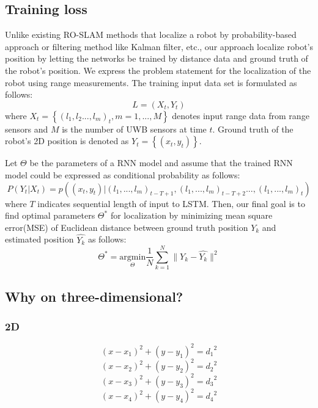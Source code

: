 \documentclass{ieeeaccess}
\begin{document}
\subsection{Training loss}

 Unlike existing RO-SLAM methods that localize a robot by probability-based approach or filtering method like Kalman filter, etc., our approach localize  robot's position by letting the networks be trained by distance data and ground truth of the robot's position. We express the problem statement for the localization of the robot using range measurements. The training input data set is formulated as follows: 
\begin{equation}
L = {(X_t, Y_t)} 
\end{equation}
where $X_t = \left\{(l_1, l_2... , l_m)_t, m = 1,...,M \right \}$ denotes input range data from range sensors and $M$ is the number of UWB sensors at time $t$. Ground truth of the robot's 2D position is denoted as $Y_t = \left\{(x_t, y_t)\right \}$.

Let $\Theta$ be the parameters of a RNN model and assume that the trained RNN model could be expressed as conditional probability as follows:
\begin{equation}
P(Y_t|X_t) = p((x_t, y_t)|(l_1,..., l_m)_{t-T+1},(l_1,..., l_m)_{t-T+2}..., (l_1,..., l_m)_t)
\end{equation}  
where $T$ indicates sequential length of input to LSTM. Then, our final goal is to find optimal parameters $\Theta^{*}$ for localization by minimizing mean square error(MSE) of Euclidean distance between ground truth position $Y_k$ and estimated position $\hat{Y_k}$ as follows:
\begin{equation}
\Theta^{*} = \underset{\Theta}{\mathrm{argmin}} \frac{1}{N} \sum_{k=1}^N \parallel Y_k - \hat{Y_k} \parallel^{2}
\end{equation}  

\subsection{Why on three-dimensional?}
\subsubsection{2D}
\begin{equation}
(x-x_1)^2+(y-y_1)^2={d_1}^2
\end{equation}
\begin{equation}
(x-x_2)^2+(y-y_2)^2={d_2}^2
\end{equation}
\begin{equation}
(x-x_3)^2+(y-y_3)^2={d_3}^2
\end{equation}
\begin{equation}
(x-x_4)^2+(y-y_4)^2={d_4}^2
\end{equation}
\end{document}

